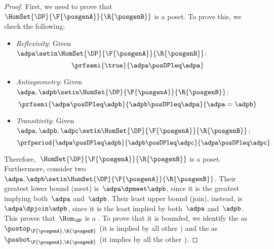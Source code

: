 \begin{proof}
    First, we need to prove that~$\HomSet{\DP}{\F{\posgenA}}{\R{\posgenB}}$ is a poset.
    To prove this, we check the following:
    \begin{itemize}
        \item \emph{Reflexivity}: Given~$\adpa\setin \HomSet{\DP}{\F{\posgenA}}{\R{\posgenB}}$:
              \begin{equation}
                  \prfsemi{
                      \true
                  }{
                      \adpa\posDPleq \adpa
                  }
              \end{equation}
        \item \emph{Antisymmetry}: Given~$\adpa,\adpb\setin \HomSet{\DP}{\F{\posgenA}}{\R{\posgenB}}$:
              \begin{equation}
                  \prfsemi{
                      \adpa\posDPleq \adpb
                  }{
                      \adpb\posDPleq \adpa
                  }{
                      \adpa=\adpb
                  }
              \end{equation}
        \item \emph{Transitivity}: Given~$\adpa,\adpb,\adpc\setin \HomSet{\DP}{\F{\posgenA}}{\R{\posgenB}}$:
              \begin{equation}
                  \prfperiod{
                      \adpa\posDPleq \adpb
                  }{
                      \adpb\posDPleq \adpc
                  }{
                      \adpa \posDPleq \adpc
                  }
              \end{equation}
    \end{itemize}
    Therefore,~$\HomSet{\DP}{\F{\posgenA}}{\R{\posgenB}}$ is a poset.
    Furthermore, consider two ~$\adpa,\adpb\setin \HomSet{\DP}{\F{\posgenA}}{\R{\posgenB}}$.
    Their greatest lower bound (meet) is~$\adpa\dpmeet\adpb$, since it is the greatest  implying both~$\adpa$ and~$\adpb$.
    Their least upper bound (join), instead, is~$\adpa\dpjoin \adpb$, since it is the least  implied by both~$\adpa$ and~$\adpb$.
    This proves that~$\Hom_\DP$ is a .
    To prove that it is bounded, we identify the  as~$\postop_{\F{\posgenA},\R{\posgenB}}$ (it is implied by all other ) and the  as~$\posbot_{\F{\posgenA},\R{\posgenB}}$ (it implies by all the other ).
\end{proof}

